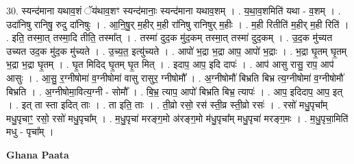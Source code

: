 \documentclass[17pt]{extarticle}
\begin{document}
30. स्यन्द॑माना यथाव॒शं ॅय॑थाव॒शꣳ स्यन्द॑मानाः॒ स्यन्द॑माना यथाव॒शम् । . य॒था॒व॒शमिति॑ यथा - व॒शम् । . उदा॑निषु रानिषु॒ रुदु दा॑निषुः । . आ॒नि॒षु॒र् म॒हीर् म॒ही रा॑निषु रानिषुर् म॒हीः । . म॒ही रितीति॑ म॒हीर् म॒ही रिति॑ । . इति॒ तस्मा॒त् तस्मा॒दि तीति॒ तस्मा᳚त् । . तस्मा॑ दुद॒क मु॑द॒कम् तस्मा॒त् तस्मा॑ दुद॒कम् । . उ॒द॒क मु॑च्यत उच्यत उद॒क मु॑द॒क मु॑च्यते । . उ॒च्य॒त॒ इत्यु॑च्यते । . आपो॑ भ॒द्रा भ॒द्रा आप॒ आपो॑ भ॒द्राः । . भ॒द्रा घृ॒तम् घृ॒तम् भ॒द्रा भ॒द्रा घृ॒तम् । . घृ॒त मिदिद् घृ॒तम् घृ॒त मित् । . इदाप॒ आप॒ इदि दापः॑ । . आप॑ आसु रासु॒ राप॒ आप॑ आसुः । . आ॒सु॒ र॒ग्नीषोमा॑ व॒ग्नीषोमा॑ वासु रासुर॒ ग्नीषोमौ᳚ । . अ॒ग्नीषोमौ॑ बिभ्रति बिभ्र त्य॒ग्नीषोमा॑ व॒ग्नीषोमौ॑ बिभ्रति । . अ॒ग्नीषोमा॒वित्य॒ग्नी - सोमौ᳚ । . बि॒भ्र॒ त्याप॒ आपो॑ बिभ्रति बिभ्र॒ त्यापः॑ । . आप॒ इदिदाप॒ आप॒ इत् । . इत् ता स्ता इदित् ताः । . ता इति॒ ताः । . ती॒व्रो रसो॒ रस॑ स्ती॒व्र स्ती॒व्रो रसः॑ । . रसो॑ मधु॒पृचा᳚म् मधु॒पृचाꣳ॒॒ रसो॒ रसो॑ मधु॒पृचा᳚म् । . म॒धु॒पृचा॑ मरङ्ग॒मो अ॑रङ्ग॒मो म॑धु॒पृचा᳚म् मधु॒पृचा॑ मरङ्ग॒मः । . म॒धु॒पृचा॒मिति॑ मधु - पृचा᳚म् । \newline

\textbf{Ghana Paata } \newline
\end{document}
